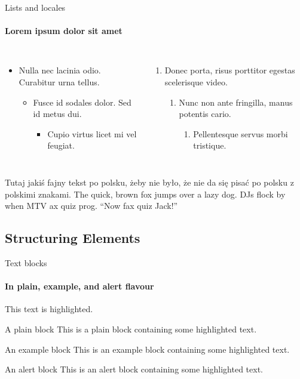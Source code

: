 \documentclass{beamer}
\begin{document}
\begin{frame}[label=lists]{Lists and locales}
    \framesubtitle{Lorem ipsum dolor sit amet}
    \begin{columns}[onlytextwidth]
        \begin{itemize}
        \item Nulla nec lacinia odio. Curabitur urna tellus.
        \begin{itemize}
            \item Fusce id sodales dolor. Sed id metus dui.
            \begin{itemize}
            \item Cupio virtus licet mi vel feugiat.
            \end{itemize}
        \end{itemize}
        \end{itemize}
        \begin{enumerate}
        \item Donec porta, risus porttitor egestas scelerisque video.
        \begin{enumerate}
            \item Nunc non ante fringilla, manus potentis cario.
            \begin{enumerate}
            \item Pellentesque servus morbi tristique.
            \end{enumerate}
        \end{enumerate}
        \end{enumerate}
    \end{columns}
    \bigskip
    \justifying

    {Tutaj jakiś fajny tekst po polsku, żeby nie było, że
    nie da się pisać po polsku z polskimi znakami.}
    {The quick, brown fox jumps over a lazy
    dog. DJs flock by when MTV ax quiz prog. “Now fax quiz Jack!”}
\end{frame}

\subsection{Structuring Elements}
\begin{frame}[label=simmonshall]{Text blocks}
    \framesubtitle{In plain, example, and \alert{alert} flavour}
    \alert{This text} is highlighted.

    \begin{block}{A plain block}
    This is a plain block containing some \alert{highlighted text}.
    \end{block}
    \begin{exampleblock}{An example block}
    This is an example block containing some \alert{highlighted text}.
    \end{exampleblock}
    \begin{alertblock}{An alert block}
    This is an alert block containing some \alert{highlighted text}.
    \end{alertblock}
\end{frame}
\end{document}
